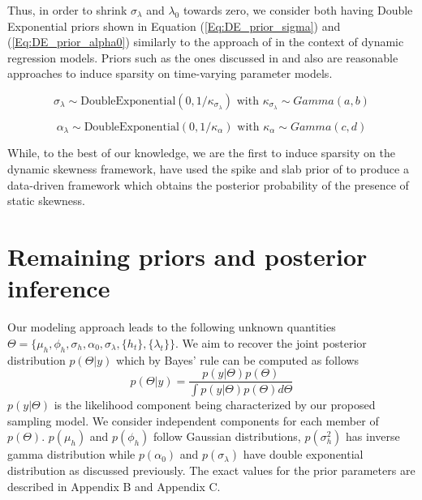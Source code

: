 \documentclass{article}
\begin{document}
Thus, in order to shrink $\sigma_{\lambda}$ and $\lambda_0$ towards zero, we consider both having Double Exponential priors shown in Equation (\ref{Eq:DE_prior_sigma}) and (\ref{Eq:DE_prior_alpha0}) similarly to the approach of \cite{belmonte2014hierarchical} in the context of dynamic regression models. Priors such as the ones discussed in \cite{lopes2022parsimony} and \cite{bitto2019achieving} also are reasonable approaches to induce sparsity on time-varying parameter models. 

\begin{equation}\label{Eq:DE_prior_sigma}
    \sigma_{\lambda} \sim \text{DoubleExponential}(0, 1/\kappa_{\sigma_{\lambda}}) \text{ with } \kappa_{\sigma_{\lambda}} \sim Gamma(a,b)
\end{equation}

\begin{equation}\label{Eq:DE_prior_alpha0}
    \alpha_{\lambda} \sim \text{DoubleExponential}(0, 1/\kappa_{\alpha}) \text{ with } \kappa_{\alpha} \sim Gamma(c,d)
\end{equation}

While, to the best of our knowledge, we are the first to induce sparsity on the dynamic skewness framework, \cite{nakajima2020skew} have used the spike and slab prior of \cite{george1993variable} to produce a data-driven framework which obtains the posterior probability of the presence of static skewness.  

\section{Remaining priors and posterior inference}\label{Sec:Posterior}

Our modeling approach leads to the following unknown quantities $ \Theta = \{ \mu_h, \phi_h, \sigma_h, \alpha_{0}, \sigma_{\lambda}, \{h_t\}, \{\lambda_t\} \}$. We aim to recover the joint posterior distribution $p(\Theta|y)$ which by Bayes' rule can be computed as follows
$$ p(\Theta|y) = \frac{p(y|\Theta) p(\Theta)}{\int p(y|\Theta) p(\Theta) d\Theta } $$
$p(y|\Theta)$ is the likelihood component being characterized by our proposed sampling model.  We consider independent components for each member of $p(\Theta)$. $p(\mu_h)$ and $p(\phi_h)$ follow Gaussian distributions, $p(\sigma_h^2)$ has inverse gamma distribution while $p(\alpha_0)$ and $p(\sigma_{\lambda})$ have double exponential distribution as discussed previously. The exact values for the prior parameters are described in Appendix B and Appendix C.  
\end{document}
